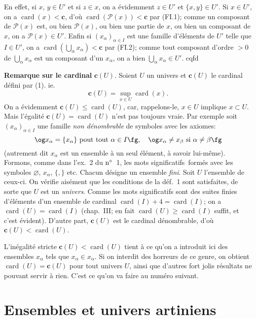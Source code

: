 \documentclass[12pt]{article}
\newcommand{\nn}{\noindent}
\newcommand{\card}{\operatorname{card}}
\begin{document}
En effet, si $x$, $y\in U'$ et si $z\in x$, on a évidemment $z\in U'$ et $\{x,y\}\in U'$. Si $x\in U'$, on a $\card(x) < \mathbf c$, d'où $\card(\mathcal{P}(x)) < \mathbf c$ par (FI.1); comme un composant de $\mathcal{P}(x)$ est, ou bien $\mathcal{P}(x)$, ou bien une partie de $x$, ou bien un composant de $x$, on a $\mathcal{P}(x)\in U'$. Enfin si $(x_{\alpha})_{\alpha\in I}$ est une famille d'éléments de $U'$ telle que $I\in U'$, on a $\card(\bigcup_{\alpha}x_{\alpha}) < \mathbf c$ par (FI.2); comme tout composant d'ordre $>0$ de $\bigcup_{\alpha}x_{\alpha}$ est un composant d'un $x_{\alpha}$, on a bien $\bigcup_{\alpha}x_{\alpha}\in U'$. cqfd

\nn\textbf{Remarque sur le cardinal} $\mathbf c(U)$. Soient $U$ un univers et $\mathbf c(U)$ le cardinal défini par (1). ie.
$$
\mathbf c(U)=\sup_{x\in U}\card(x).
$$
On a évidemment $\mathbf c(U)\leq \card(U)$, car, rappelons-le, $x\in U$ implique $x\subset U$. Mais l'égalité $\mathbf c(U)=\card(U)$ n'est pas toujours vraie. Par exemple soit $(x_{\alpha})_{\alpha\in I}$ une famille \emph{non dénombrable} de symboles avec les axiomes:
$$
\text{\og}x_{\alpha}=\{x_{\alpha}\}\text{ pout tout }\alpha\in I\text{\fg},\quad\text{\og}x_{\alpha}\neq x_{\beta}\text{ si }\alpha\neq\beta\text{\fg}
$$
(autrement dit $x_{\alpha}$ est un ensemble à un seul élément, à savoir lui-même). Formons, comme dans l'ex.~2 du $\rm n^\circ$~1, les  \og mots significatifs\fg\ formés avec les symboles $\varnothing$, $x_{\alpha}$, $\{,\}$ etc. Chacun désigne un ensemble \emph{fini}. Soit $U$ l'ensemble de ceux-ci. On vérifie aisément que les conditions de la déf.~1 sont satisfaites, de sorte que $U$ est un \emph{univers}. Comme les mots significatifs sont des suites finies d'éléments d'un ensemble de cardinal $\card(I)+4=\card(I)$; on a $\card(U)=\card(I)$ (chap.~III; en fait $\card(U)\geq \card(I)$ suffit, et c'est évident). D'autre part, $\mathbf c(U)$ est le cardinal dénombrable, d'où $\mathbf c(U) < \card(U)$.

L'inégalité stricte $\mathbf c(U) < \card(U)$ tient à ce qu'on a introduit ici des ensembles $x_{\alpha}$ tels que $x_{\alpha}\in x_{\alpha}$. Si on interdit des horreurs de ce genre, on obtient $\card(U)=\mathbf c(U)$ pour tout univers $U$, ainsi que d'autres fort jolis résultats \og ne pouvant servir à rien\fg. C'est ce qu'on va faire au numéro suivant.

\section{Ensembles et univers artiniens}
\end{document}
